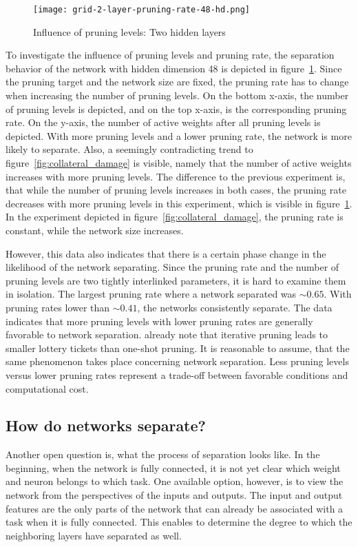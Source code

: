 \begin{figure}[ht] %
    \centering
    \texttt{[image: grid-2-layer-pruning-rate-48-hd.png]}
    \caption{Influence of pruning levels: Two hidden layers
    }\label{fig:grid-2}
\end{figure}

To investigate the influence of pruning levels and pruning rate, the separation behavior of the network with hidden dimension 48 is depicted in figure~\ref{fig:grid-2}.
Since the pruning target and the network size are fixed, the pruning rate has to change when increasing the number of pruning levels.
On the bottom x-axis, the number of pruning levels is depicted, and on the top x-axis, is the corresponding pruning rate.
On the y-axis, the number of active weights after all pruning levels is depicted.
With more pruning levels and a lower pruning rate, the network is more likely to separate.
Also, a seemingly contradicting trend to figure~\ref{fig:collateral_damage} is visible, namely that the number of active weights increases with more pruning levels.
The difference to the previous experiment is, that while the number of pruning levels increases in both cases, the pruning rate decreases with more pruning levels in this experiment, which is visible in figure~\ref{fig:grid-2}. In the experiment depicted in figure~\ref{fig:collateral_damage}, the pruning rate is constant, while the network size increases.

However, this data also indicates that there is a certain phase change in the likelihood of the network separating.
Since the pruning rate and the number of pruning levels are two tightly interlinked parameters, it is hard to examine them in isolation.
The largest pruning rate where a network separated was $\sim0.65$. 
With pruning rates lower than $\sim0.41$, the networks consistently separate.
The data indicates that more pruning levels with lower pruning rates are generally favorable to network separation.
\textcite{LTH} already note that iterative pruning leads to smaller lottery tickets than one-shot pruning.
It is reasonable to assume, that the same phenomenon takes place concerning network separation.
Less pruning levels versus lower pruning rates represent a trade-off between favorable conditions and computational cost.

\subsection{How do networks separate?}
Another open question is, what the process of separation looks like.
In the beginning, when the network is fully connected, it is not yet clear which weight and neuron belongs to which task.
One available option, however, is to view the network from the perspectives of the inputs and outputs.
The input and output features are the only parts of the network that can already be associated with a task when it is fully connected.
This enables to determine the degree to which the neighboring layers have separated as well.


